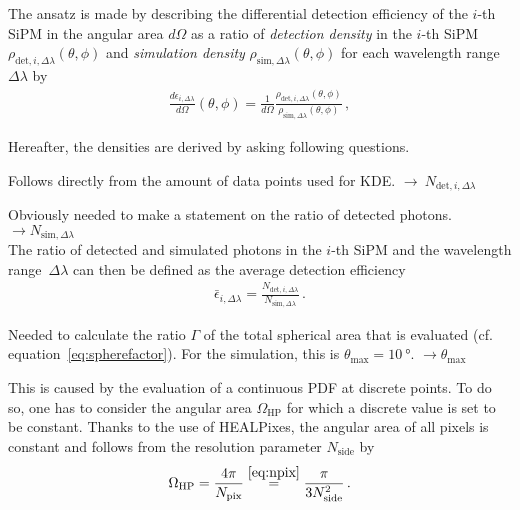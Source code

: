 The ansatz is made by describing the differential detection efficiency of the $i$-th SiPM in the angular area $d\Omega$ as a ratio of \textit{detection density} in the $i$-th SiPM $\rho_{\text{det},i,\Delta\lambda}(\theta,\phi)$ and \textit{simulation density} $\rho_{\text{sim},\Delta\lambda}(\theta,\phi)$ for each wavelength range $\Delta\lambda$ by
\begin{align}
\frac{d\epsilon_{i,\Delta\lambda}}{d\Omega}(\theta,\phi) = \frac{1}{d\Omega} \frac{\rho_{\text{det},i,\Delta\lambda}(\theta,\phi)}{\rho_{\text{sim},\Delta\lambda}(\theta,\phi)}\,,
\end{align}

Hereafter, the densities are derived by asking following questions.

Follows directly from the amount of data points used for KDE. $\rightarrow~N_{\text{det},i,\Delta\lambda}$

Obviously needed to make a statement on the ratio of detected photons. $\rightarrow N_{\text{sim},\Delta\lambda}$\\
The ratio of detected and simulated photons in the $i$-th SiPM and the wavelength range~$\Delta\lambda$ can then be defined as the average detection efficiency 
\begin{align}
	\bar{\epsilon}_{i,\Delta\lambda} = \frac{N_{\text{det},i,\Delta\lambda}}{N_{\text{sim},\Delta\lambda}}\,.
\end{align}

Needed to calculate the ratio $\Gamma$ of the total spherical area that is evaluated (cf. equation~\eqref{eq:spherefactor}). For the \iceact simulation, this is $\theta_\text{max} = \SI{10}{\degree}$. $\rightarrow \theta_\text{max}$

This is caused by the evaluation of a continuous PDF at discrete points. To do so, one has to consider the angular area $\Omega_\text{HP}$ for which a discrete value is set to be constant. Thanks to the use of HEALPixes, the angular area of all pixels is constant and follows from the resolution parameter $N_\text{side}$ by
\begin{align}
	\Omega_\text{HP} = \frac{4\pi}{N_\text{pix}} \overset{\eqref{eq:npix}}{=} \frac{\pi}{3N_\text{side}^2}\,.
	\label{eq:omega_hp}
\end{align}\\

